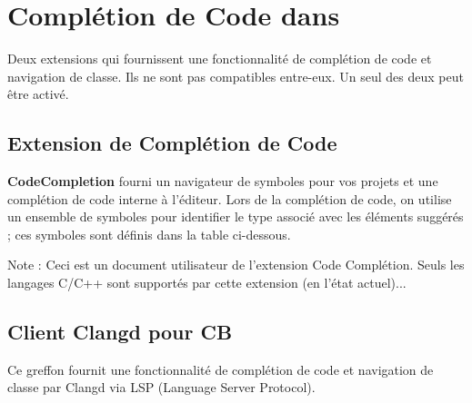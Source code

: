 \section{Complétion de Code dans \codeblocks}\label{sec:codecompletion}

Deux extensions qui fournissent une fonctionnalité de complétion de code et navigation de classe. Ils ne sont pas compatibles entre-eux. Un seul des deux peut être activé.
 

\subsection{Extension de Complétion de Code }


\textbf{CodeCompletion} fourni un navigateur de symboles pour vos projets et une complétion de code interne à l'éditeur.
Lors de la complétion de code, on utilise un ensemble de symboles pour identifier le type associé avec les éléments suggérés ; ces symboles sont définis dans la table ci-dessous.


Note : Ceci est un document utilisateur de l'extension Code Complétion.
Seuls les langages C/C++ sont supportés par cette extension (en l'état actuel)...

\subsection{Client Clangd pour CB}

Ce greffon fournit une fonctionnalité de complétion de code et navigation de classe par Clangd via LSP (Language Server Protocol).

